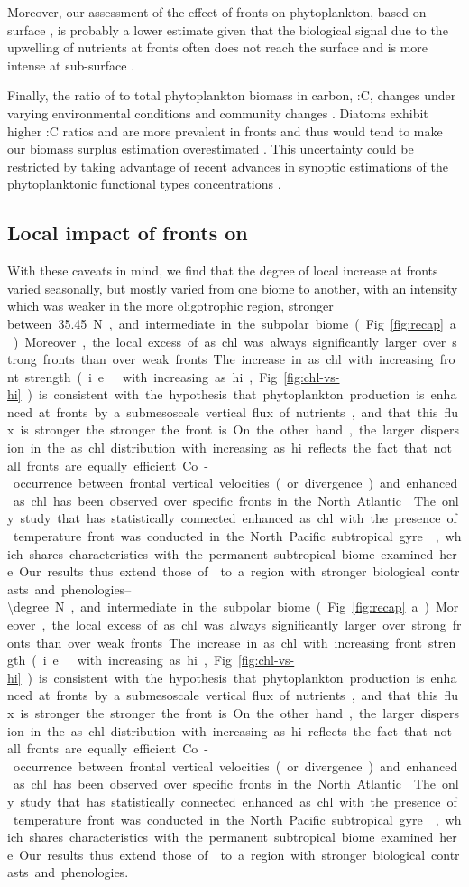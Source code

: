 Moreover, our assessment of the effect of fronts on phytoplankton, based on surface , is probably a lower estimate given that the biological signal due to the upwelling of nutrients at fronts often does not reach the surface and is more intense at sub-surface \parencite{mourino_2004, ruiz_2019}.

Finally, the ratio of  to total phytoplankton biomass in carbon, :C, changes under varying environmental conditions and community changes \parencite{behrenfeld_2015, halsey_2015, inomura_2022}.
Diatoms exhibit higher :C ratios and are more prevalent in fronts and thus would tend to make our biomass surplus estimation overestimated \parencite{treguer_2018}.
This uncertainty could be restricted by taking advantage of recent advances in synoptic estimations of the phytoplanktonic functional types concentrations \parencite{elhourany_2019}.

\subsection{Local impact of fronts on }

With these caveats in mind, we find that the degree of local  increase at fronts varied seasonally, but mostly varied from one biome to another, with an intensity which was weaker in the more oligotrophic region, stronger between~\qtyrange{35,45}{\degree}N, and intermediate in the subpolar biome (Fig.~\ref{fig:recap}a).
Moreover, the local excess of \as{chl} was always significantly larger over strong fronts than over weak fronts.
The increase in \as{chl} with increasing front strength (i.e.\ with increasing \as{hi}, Fig.~\ref{fig:chl-vs-hi}) is consistent with the hypothesis that phytoplankton production is enhanced at fronts by a submesoscale vertical flux of nutrients, and that this flux is stronger the stronger the front is.
On the other hand, the larger dispersion in the \as{chl} distribution with increasing \as{hi} reflects the fact that not all fronts are equally efficient.

Co-occurrence between frontal vertical velocities (or divergence) and enhanced \as{chl} has been observed over specific fronts in the North Atlantic \parencite{mourino_2004, allen_2005, lehahn_2007}.
The only study that has statistically connected enhanced \as{chl} with the presence of temperature front was conducted in the North Pacific subtropical gyre \parencite{liu_2016}, which shares characteristics with the permanent subtropical biome examined here.
Our results thus extend those of \textcite{liu_2016} to a region with stronger biological contrasts and phenologies.

